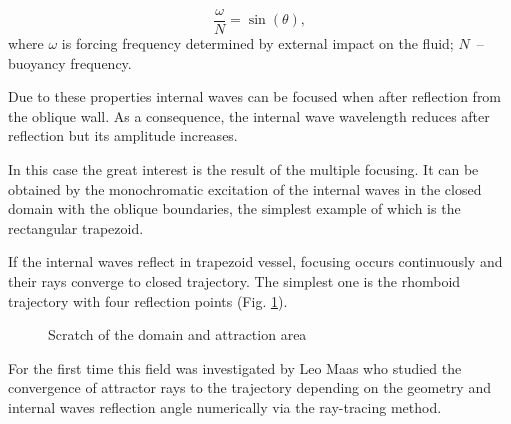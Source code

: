 \documentclass{article}
\begin{document}
$$\frac{\omega}{N} = \sin(\theta),$$ \noident where $\omega$ is forcing frequency determined by external impact on the fluid; 
$N$~-- buoyancy frequency.


Due to these properties internal waves can be focused when after reflection from the oblique wall. As a consequence,  the internal wave wavelength reduces after reflection but its amplitude increases.


In this case the great interest is the result of the multiple focusing. It can be obtained by the monochromatic excitation of the internal waves in the closed domain with the oblique boundaries, the simplest example of which is the rectangular trapezoid.

If the internal waves reflect in trapezoid vessel, focusing occurs continuously and their rays converge to closed trajectory. The simplest one is the rhomboid trajectory with four reflection points (Fig. \ref{fig:dominleft}).

\begin{figure}[!ht]
    \centering
    \caption{Scratch of the domain and attraction area}
    \label{fig:dominleft}
\end{figure}



For the first time this field was investigated by Leo Maas \cite{Maas1995} who studied the convergence of attractor rays to the trajectory depending on the geometry and internal waves reflection angle numerically via the ray-tracing method.
\end{document}
